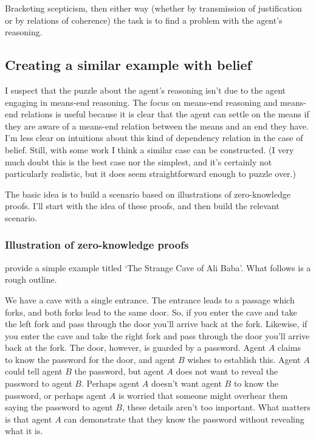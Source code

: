 \documentclass[10pt]{article}
\begin{document}
Bracketing scepticism, then either way (whether by transmission of justification or by relations of coherence) the task is to find a problem with the agent's reasoning.

\subsection{Creating a similar example with belief}
\label{sec:creat-simil-example}

I suspect that the puzzle about the agent's reasoning isn't due to the agent engaging in means-end reasoning.
The focus on means-end reasoning and means-end relations is useful because it is clear that the agent can settle on the means if they are aware of a means-end relation between the means and an end they have.
I'm less clear on intuitions about this kind of dependency relation in the case of belief.
Still, with some work I think a similar case can be constructed.
(I very much doubt this is the best case nor the simplest, and it's certainly not particularly realistic, but it does seem straightforward enough to puzzle over.)

The basic idea is to build a scenario based on illustrations of zero-knowledge proofs.
I'll start with the idea of these proofs, and then build the relevant scenario.

\subsubsection{Illustration of zero-knowledge proofs}
\label{sec:illustr-zero-knowl}

\citeauthor{Quisquater:1989aa} provide a simple example titled `The Strange Cave of Ali Baba'.
What follows is a rough outline.

We have a cave with a single entrance.
The entrance leads to a passage which forks, and both forks lead to the same door.
So, if you enter the cave and take the left fork and pass through the door you'll arrive back at the fork.
Likewise, if you enter the cave and take the right fork and pass through the door you'll arrive back at the fork.
The door, however, is guarded by a password.
Agent \(A\) claims to know the password for the door, and agent \(B\) wishes to establish this.
Agent \(A\) could tell agent \(B\) the password, but agent \(A\) does not want to reveal the password to agent \(B\).
Perhaps agent \(A\) doesn't want agent \(B\) to know the password, or perhaps agent \(A\) is worried that someone might overhear them saying the password to agent \(B\), these details aren't too important.
What matters is that agent \(A\) can demonstrate that they know the password without revealing what it is.
\end{document}
